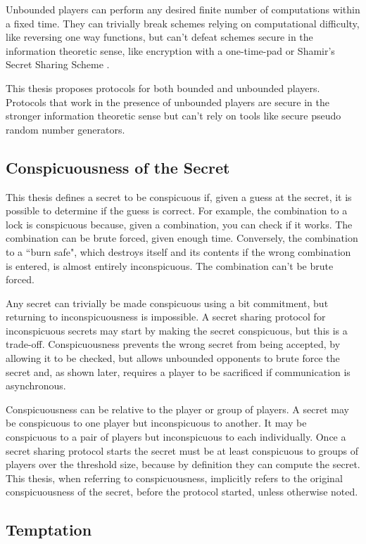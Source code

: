 \documentclass{dalcsthesis}
\begin{document}
Unbounded players can perform any desired finite number of computations within a fixed time. They can trivially break schemes relying on computational difficulty, like reversing one way functions, but can't defeat schemes secure in the information theoretic sense, like encryption with a one-time-pad or Shamir's Secret Sharing Scheme \cite{shamir79}.

This thesis proposes protocols for both bounded and unbounded players. Protocols that work in the presence of unbounded players are secure in the stronger information theoretic sense but can't rely on tools like secure pseudo random number generators.

\subsection{Conspicuousness of the Secret} 

This thesis defines a secret to be conspicuous if, given a guess at the secret, it is possible to determine if the guess is correct. For example, the combination to a lock is conspicuous because, given a combination, you can check if it works. The combination can be brute forced, given enough time. Conversely, the combination to a ``burn safe", which destroys itself and its contents if the wrong combination is entered, is almost entirely inconspicuous. The combination can't be brute forced.

Any secret can trivially be made conspicuous using a bit commitment, but returning to inconspicuousness is impossible. A secret sharing protocol for inconspicuous secrets may start by making the secret conspicuous, but this is a trade-off. Conspicuousness prevents the wrong secret from being accepted, by allowing it to be checked, but allows unbounded opponents to brute force the secret and, as shown later, requires a player to be sacrificed if communication is asynchronous.

Conspicuousness can be relative to the player or group of players. A secret may be conspicuous to one player but inconspicuous to another. It may be conspicuous to a pair of players but inconspicuous to each individually. Once a secret sharing protocol starts the secret must be at least conspicuous to groups of players over the threshold size, because by definition they can compute the secret. This thesis, when referring to conspicuousness, implicitly refers to the original conspicuousness of the secret, before the protocol started, unless otherwise noted.

\subsection{Temptation}
\end{document}
